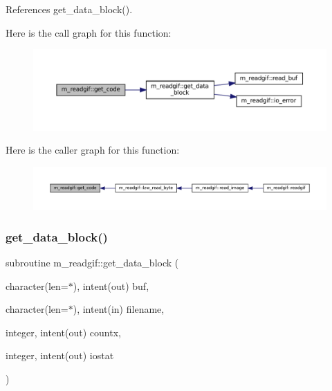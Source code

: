 References get\+\_\+data\+\_\+block().

Here is the call graph for this function\+:
\nopagebreak
\begin{figure}[H]
\begin{center}
\leavevmode
\includegraphics[width=350pt]{namespacem__readgif_a027fedbf7ba68763483988c1aa6d2cea_cgraph}
\end{center}
\end{figure}
Here is the caller graph for this function\+:
\nopagebreak
\begin{figure}[H]
\begin{center}
\leavevmode
\includegraphics[width=350pt]{namespacem__readgif_a027fedbf7ba68763483988c1aa6d2cea_icgraph}
\end{center}
\end{figure}
\mbox{\label{namespacem__readgif_ace6e51d0293107696bd1482348414a43}} 
\subsubsection{\texorpdfstring{get\+\_\+data\+\_\+block()}{get\_data\_block()}}
{\footnotesize\ttfamily subroutine m\+\_\+readgif\+::get\+\_\+data\+\_\+block (\begin{DoxyParamCaption}\item[{character(len=$\ast$), intent(out)}]{buf,  }\item[{character(len=$\ast$), intent(in)}]{filename,  }\item[{integer, intent(out)}]{countx,  }\item[{integer, intent(out)}]{iostat }\end{DoxyParamCaption})\hspace{0.3cm}{\ttfamily [private]}}



